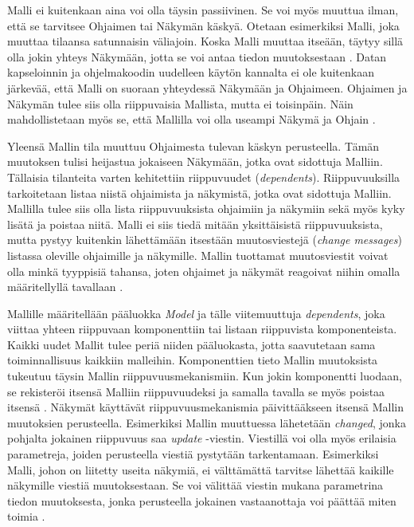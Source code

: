 \documentclass[utf8]{gradu3}
\begin{document}
Malli ei kuitenkaan aina voi olla täysin passiivinen. Se voi myös muuttua ilman, että se tarvitsee Ohjaimen tai Näkymän käskyä. Otetaan esimerkiksi Malli, joka muuttaa tilaansa satunnaisin väliajoin. Koska Malli muuttaa itseään, täytyy sillä olla jokin yhteys Näkymään, jotta se voi antaa tiedon muutoksestaan \parencite{burbeck}. Datan kapseloinnin ja ohjelmakoodin uudelleen käytön kannalta ei ole kuitenkaan järkevää, että Malli on suoraan yhteydessä Näkymään ja Ohjaimeen. Ohjaimen ja Näkymän tulee siis olla riippuvaisia Mallista, mutta ei toisinpäin. Näin mahdollistetaan myös se, että Mallilla voi olla useampi Näkymä ja Ohjain \parencite[s. 4]{krasner_desc}.

Yleensä Mallin tila muuttuu Ohjaimesta tulevan käskyn perusteella. Tämän muutoksen tulisi heijastua jokaiseen Näkymään, jotka ovat sidottuja Malliin. Tällaisia tilanteita varten kehitettiin riippuvuudet (\emph{dependents}).
Riippuvuuksilla tarkoitetaan listaa niistä ohjaimista ja näkymistä, jotka ovat sidottuja Malliin. Mallilla tulee siis olla lista riippuvuuksista ohjaimiin ja näkymiin sekä myös kyky lisätä ja poistaa niitä. Malli ei siis tiedä mitään yksittäisistä riippuvuuksista, mutta pystyy kuitenkin lähettämään itsestään muutosviestejä (\emph{change messages}) listassa oleville ohjaimille ja näkymille. Mallin tuottamat muutosviestit voivat olla minkä tyyppisiä tahansa, joten ohjaimet ja näkymät reagoivat niihin omalla määritellyllä tavallaan \parencite[s.2-3]{krasner}.

Mallille määritellään pääluokka \emph{Model} ja tälle viitemuuttuja \emph{dependents}, joka viittaa yhteen riippuvaan komponenttiin tai listaan riippuvista komponenteista. Kaikki uudet Mallit tulee periä niiden pääluokasta, jotta saavutetaan sama toiminnallisuus kaikkiin malleihin. Komponenttien tieto Mallin muutoksista tukeutuu täysin Mallin riippuvuusmekanismiin. Kun jokin komponentti luodaan, se rekisteröi itsensä Malliin riippuvuudeksi ja samalla tavalla se myös poistaa itsensä \parencite{burbeck}. Näkymät käyttävät riippuvuusmekanismia päivittääkseen itsensä Mallin muutoksien perusteella. Esimerkiksi Mallin muuttuessa lähetetään \textit{changed}, jonka pohjalta jokainen riippuvuus saa \textit{update} -viestin. Viestillä voi olla myös erilaisia parametreja, joiden perusteella viestiä pystytään tarkentamaan. Esimerkiksi Malli, johon on liitetty useita näkymiä, ei välttämättä tarvitse lähettää kaikille näkymille viestiä muutoksestaan. Se voi välittää viestin mukana parametrina tiedon muutoksesta, jonka perusteella jokainen vastaanottaja voi päättää miten toimia \parencite{burbeck}.
\end{document}
